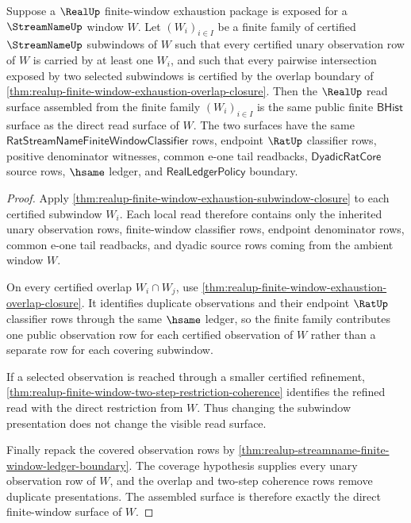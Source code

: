 \begin{theorem}
\label{thm:realup-finite-window-partition-exactness}
Suppose a $\RealUp$ finite-window exhaustion package is exposed for a
$\StreamNameUp$ window $W$. Let $(W_i)_{i\in I}$ be a finite family of
certified $\StreamNameUp$ subwindows of $W$ such that every certified unary
observation row of $W$ is carried by at least one $W_i$, and such that every
pairwise intersection exposed by two selected subwindows is certified by the
overlap boundary of
\autoref{thm:realup-finite-window-exhaustion-overlap-closure}. Then the
$\RealUp$ read surface assembled from the finite family $(W_i)_{i\in I}$ is
the same public finite $\mathsf{BHist}$ surface as the direct read surface of
$W$. The two surfaces have the same
$\mathsf{RatStreamNameFiniteWindowClassifier}$ rows, endpoint $\RatUp$
classifier rows, positive denominator witnesses, common e-one tail readbacks,
$\mathsf{DyadicRatCore}$ source rows, $\hsame$ ledger, and
$\mathsf{RealLedgerPolicy}$ boundary.
\end{theorem}
\begin{proof}
Apply \autoref{thm:realup-finite-window-exhaustion-subwindow-closure} to each
certified subwindow $W_i$. Each local read therefore contains only the
inherited unary observation rows, finite-window classifier rows, endpoint
denominator rows, common e-one tail readbacks, and dyadic source rows coming
from the ambient window $W$.

On every certified overlap $W_i\cap W_j$, use
\autoref{thm:realup-finite-window-exhaustion-overlap-closure}. It identifies
duplicate observations and their endpoint $\RatUp$ classifier rows through the
same $\hsame$ ledger, so the finite family contributes one public observation
row for each certified observation of $W$ rather than a separate row for each
covering subwindow.

If a selected observation is reached through a smaller certified refinement,
\autoref{thm:realup-finite-window-two-step-restriction-coherence} identifies
the refined read with the direct restriction from $W$. Thus changing the
subwindow presentation does not change the visible read surface.

Finally repack the covered observation rows by
\autoref{thm:realup-streamname-finite-window-ledger-boundary}. The coverage
hypothesis supplies every unary observation row of $W$, and the overlap and
two-step coherence rows remove duplicate presentations. The assembled surface
is therefore exactly the direct finite-window surface of $W$.
\end{proof}

